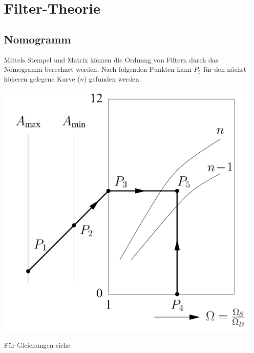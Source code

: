 \section{Filter-Theorie}
\subsection{Nomogramm}
 Mittels Stempel und Matrix können die Ordnung von Filtern durch das Nomogramm berechnet werden. Nach folgenden Punkten kann $P_5$ für den nächst höheren gelegene Kurve ($n$) gefunden werden.
\begin{center}
	\includegraphics[width=0.6\columnwidth]{Images/nomogramm}
\end{center}
Für Gleichungen siehe 
